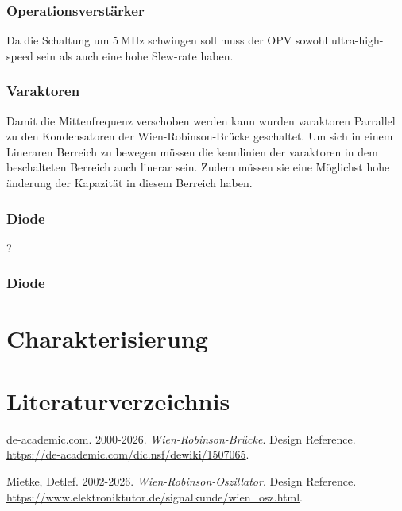\documentclass[
  ngerman,
  11pt,
  a4paper,
  DIV=11,
  twoside]{scrreprt}
\newlength{\cslhangindent}
\newenvironment{CSLReferences}[2] %
 {\begin{list}{}{%
  \setlength{\itemindent}{0pt}
  \setlength{\leftmargin}{0pt}
  \setlength{\parsep}{0pt}
  \ifodd #1
   \setlength{\leftmargin}{\cslhangindent}
   \setlength{\itemindent}{-1\cslhangindent}
  \fi
  \setlength{\itemsep}{#2\baselineskip}}}
 {\end{list}}
\begin{document}
\subsection{Operationsverstärker}\label{operationsverstuxe4rker}

Da die Schaltung um \(5~\text{MHz}\) schwingen soll muss der OPV sowohl
ultra-high-speed sein als auch eine hohe Slew-rate haben.

\subsection{Varaktoren}\label{varaktoren}

Damit die Mittenfrequenz verschoben werden kann wurden varaktoren
Parrallel zu den Kondensatoren der Wien-Robinson-Brücke geschaltet. Um
sich in einem Lineraren Berreich zu bewegen müssen die kennlinien der
varaktoren in dem beschalteten Berreich auch linerar sein. Zudem müssen
sie eine Möglichst hohe änderung der Kapazität in diesem Berreich haben.

\subsection{Diode}\label{diode}

?

\subsection{Diode}\label{diode}

\chapter{Charakterisierung}\label{charakterisierung}

\chapter*{Literaturverzeichnis}\label{literaturverzeichnis}

\protect{}\label{refs}
\begin{CSLReferences}{1}{1}
{de-academic.com}. 2000-2026. \emph{Wien-Robinson-Brücke}. Design
Reference. \url{https://de-academic.com/dic.nsf/dewiki/1507065}.

Mietke, Detlef. 2002-2026. \emph{Wien-Robinson-Oszillator}. Design
Reference.
\url{https://www.elektroniktutor.de/signalkunde/wien_osz.html}.

\end{CSLReferences}
\end{document}
